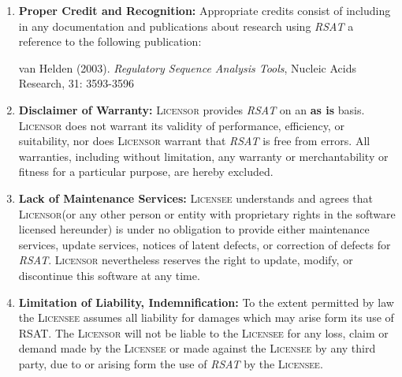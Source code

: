 \documentclass[12pt]{article}
\newcommand{\RSAT}[0]{\emph{RSAT}\xspace}
\newcommand{\Licensor}[0]{\textsc{Licensor}\xspace}
\newcommand{\Licensee}[0]{\textsc{Licensee}\xspace}
\newcommand{\Paragraph}[2]{\item \textbf{#1:} #2}
\begin{document}
\begin{enumerate}
\Paragraph{Proper Credit and Recognition}{Appropriate credits consist 
of including in any documentation and publications about research
using \RSAT a reference to the following publication: \par van Helden
(2003). \emph{Regulatory Sequence Analysis Tools}, Nucleic Acids
Research, 31: 3593-3596}

\Paragraph{Disclaimer of Warranty}{\Licensor provides \RSAT 
on an \textbf{as is} basis. \Licensor does not warrant its validity of 
performance, efficiency, or suitability, nor does \Licensor warrant 
that \RSAT is free from errors. All warranties, 
including without limitation, any warranty or merchantability or 
fitness for a particular purpose, are hereby excluded.
}

\Paragraph{Lack of Maintenance Services}{\Licensee understands and 
agrees that \Licensor (or any other person or entity with proprietary
rights in the software licensed hereunder) is under no obligation to
provide either maintenance services, update services, notices of
latent defects, or correction of defects for \RSAT.  \Licensor
nevertheless reserves the right to update, modify, or discontinue this
software at any time.  }

\Paragraph{Limitation of Liability, Indemnification}{
To the extent permitted by law the \Licensee assumes all liability for
damages which may arise form its use of RSAT. The \Licensor will not
be liable to the \Licensee for any loss, claim or demand made by the
\Licensee or made against the \Licensee by any third party, due to or
arising form the use of \RSAT by the \Licensee.

}


\end{enumerate}
\end{document}
